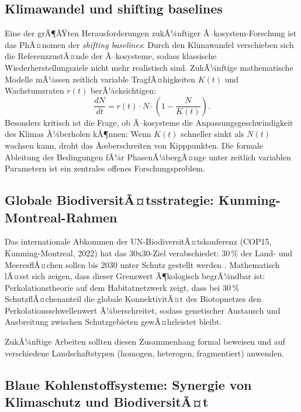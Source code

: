 ﻿\documentclass[a4paper,12pt]{article}
\theoremstyle{definition}
\begin{document}
\subsection{Klimawandel und shifting baselines}

Eine der grÃ¶ÃŸten Herausforderungen zukÃ¼nftiger Ã–kosystem-Forschung ist das PhÃ¤nomen der \emph{shifting baselines}: Durch den Klimawandel verschieben sich die ReferenzzustÃ¤nde der Ã–kosysteme, sodass klassische Wiederherstellungsziele nicht mehr realistisch sind. ZukÃ¼nftige mathematische Modelle mÃ¼ssen zeitlich variable TragfÃ¤higkeiten $K(t)$ und Wachstumsraten $r(t)$ berÃ¼cksichtigen:
\[
\frac{dN}{dt} = r(t) \cdot N \cdot \left(1 - \frac{N}{K(t)}\right).
\]
Besonders kritisch ist die Frage, ob Ã–kosysteme die Anpassungsgeschwindigkeit des Klimas Ã¼berholen kÃ¶nnen: Wenn $K(t)$ schneller sinkt als $N(t)$ wachsen kann, droht das Ãœberschreiten von Kipppunkten. Die formale Ableitung der Bedingungen fÃ¼r PhasenÃ¼bergÃ¤nge unter zeitlich variablen Parametern ist ein zentrales offenes Forschungsproblem.

\subsection{Globale BiodiversitÃ¤tsstrategie: Kunming-Montreal-Rahmen}

Das internationale Abkommen der UN-BiodiversitÃ¤tskonferenz (COP15, Kunming-Montreal, 2022) hat das 30x30-Ziel verabschiedet: 30\,\% der Land- und MeeresflÃ¤chen sollen bis 2030 unter Schutz gestellt werden \cite{unep2022kunming}. Mathematisch lÃ¤sst sich zeigen, dass dieser Grenzwert Ã¶kologisch begrÃ¼ndbar ist: Perkolationstheorie auf dem Habitatnetzwerk zeigt, dass bei 30\,\% SchutzflÃ¤chenanteil die globale KonnektivitÃ¤t des Biotopnetzes den Perkolationsschwellenwert Ã¼berschreitet, sodass genetischer Austausch und Ausbreitung zwischen Schutzgebieten gewÃ¤hrleistet bleibt.

ZukÃ¼nftige Arbeiten sollten diesen Zusammenhang formal beweisen und auf verschiedene Landschaftstypen (homogen, heterogen, fragmentiert) anwenden.

\subsection{Blaue Kohlenstoffsysteme: Synergie von Klimaschutz und BiodiversitÃ¤t}
\end{document}
